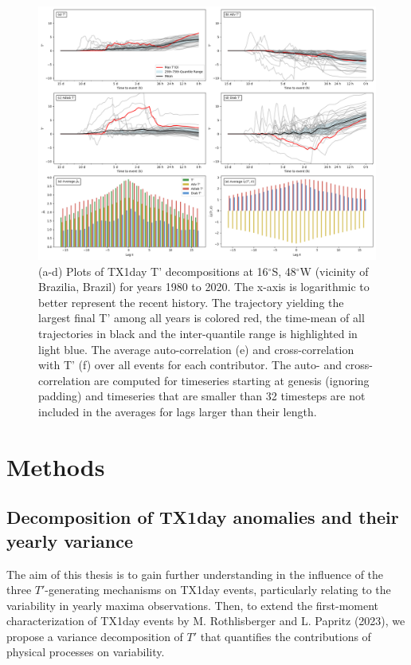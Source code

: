 \documentclass[11pt,a4paper,twoside,openright]{report}
\theoremstyle{definition}
\begin{document}
\begin{figure}[h]
\includegraphics[width=1\linewidth]{images/timeseries_data} \caption{(a-d) Plots of TX1day T' decompositions at 16$^{\circ}$S, 48$^{\circ}$W (vicinity of Brazilia, Brazil) for years 1980 to 2020. The x-axis is logarithmic to better represent the recent history. The trajectory yielding the largest final T' among all years is colored red, the time-mean of all trajectories in black and the inter-quantile range is highlighted in light blue. The average auto-correlation (e) and cross-correlation with T' (f) over all events for each contributor. The auto- and cross-correlation are computed for timeseries starting at genesis (ignoring padding) and timeseries that are smaller than 32 timesteps are not included in the averages for lags larger than their length.}\label{fig:timeseriesdata}
\end{figure}

\chapter{Methods}\label{methods}

\section{Decomposition of TX1day anomalies and their yearly variance}\label{decomposition-of-tx1day-anomalies-and-their-yearly-variance}

The aim of this thesis is to gain further understanding in the influence of the three \(T'\)-generating mechanisms on TX1day events, particularly relating to the variability in yearly maxima observations. Then, to extend the first-moment characterization of TX1day events by M. Rothlisberger and L. Papritz (2023), we propose a variance decomposition of \(T'\) that quantifies the contributions of physical processes on variability.
\end{document}
